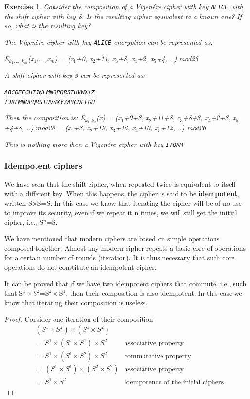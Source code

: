 \documentclass[a4paper, 12pt]{report}
\newtheorem{exercise}{\textbf{Exercise}}
\begin{document}
\begin{exercise}
	Consider the composition of a Vigenére cipher with key \texttt{ALICE} with the shift cipher with key 8. Is the resulting cipher equivalent to a known one? If so, what is the resulting key?
	
	The Vigenère cipher with key \texttt{ALICE} encryption can be represented as:
	\begin{center}
		E$_{k_1,...,k_m}$(x$_1$,...,x$_m$) = (x$_1$+0, x$_2$+11, x$_3$+8, x$_4$+2, x$_5$+4, ..) mod26
	\end{center}
	
	A shift cipher with key 8 can be represented as:
	\begin{center}
		\texttt{ABCDEFGHIJKLMNOPQRSTUVWXYZ}\\
		\texttt{IJKLMNOPQRSTUVWXYZABCDEFGH}
	\end{center}

	Then the composition is:
	E$_{k_1,k_2}$(x) = (x$_1$+0+8, x$_2$+11+8, x$_3$+8+8, x$_4$+2+8, x$_5$+4+8, ..) mod26 = (x$_1$+8, x$_2$+19, x$_3$+16, x$_4$+10, x$_5$+12, ..) mod26
	
	This is nothing more then a Vigenére cipher with key \texttt{ITQKM}
\end{exercise}

\subsubsection{Idempotent ciphers}
We have seen that the shift cipher, when repeated twice is equivalent to itself with a different key. When this happens, the cipher is said to be \textbf{idempotent}, written S$\times$S=S. In this case we know that iterating the cipher will be of no use to improve its security, even if we repeat it n times, we will still get the initial cipher, i.e., S$^n$=S.

We have mentioned that modern ciphers are based on simple operations composed together. Almost any modern cipher repeats a basic core of operations for a certain number of rounds (iteration). It is thus necessary that such core operations do not constitute an idempotent cipher.

It can be proved that if we have two idempotent ciphers that commute, i.e., such that S$^1\times$S$^2$=S$^2\times$S$^1$, then their composition is also idempotent. In this case we know that iterating their composition is useless.

\begin{proof}
	Consider one iteration of their composition
	\setcounter{equation}{0}
	\begin{align}
		&(S^1\times S^2)\times(S^1\times S^2)\\
		&=S^1\times (S^2\times S^1)\times S^2 &\text{associative property}\\
		&=S^1\times (S^1\times S^2)\times S^2 &\text{commutative property}\\
		&=(S^1\times S^1)\times (S^2\times S^2) &\text{associative property}\\
		&=S^1\times S^2 &\text{idempotence of the initial ciphers}
	\end{align}
\end{proof} 
\end{document}
